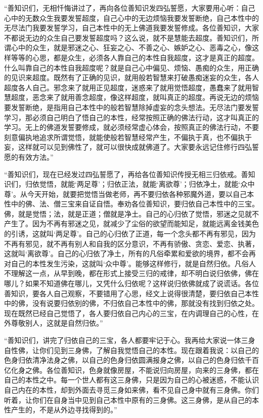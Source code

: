 \documentclass[12pt,twoside,openany]{book}
\newcommand{\kai}[1]{{\CJKfamily{kai}#1}}
\begin{document}
\kai{“善知识们，无相忏悔讲过了，再向各位善知识发四弘誓愿，大家要用心听：自己心中的无数众生我要发誓超度，自己心中的无边烦恼我要发誓断绝，自己本性中的无尽法门我要发誓学习，自己本性中的无上佛道我要发誓修成。各位善知识，大家不都说无边的众生自己要发誓超度吗？这么说，就不是慧能去超度。善知识们，所谓心中的众生，就是邪迷之心、狂妄之心、不善之心、嫉妒之心、恶毒之心，像这样等等的心思，都是众生，必须各人靠自己的本性自我超度，这才是真正的超度。什么叫靠自己的本性自我超度呢？就是自己心中偏见、烦恼、愚痴的众生，用正确的见识来超度。既然有了正确的见识，就用般若智慧来打破愚痴迷妄的众生，各人超度各人自己。邪念来了就用正见超度，迷惑来了就用觉悟超度，愚蠢来了就用智慧超度，恶念来了就用善念超度，像这样超度，就叫真正的超度。再说无边的烦恼要发誓断绝，是指用自己本性中的般若智慧除掉虚妄的念头想法。无尽法门要发誓学习，那必须自己明白了悟自己的本性，经常按照正确的佛法行动，这才叫真正的学习。无上的佛道发誓要修成，就必须经常虚心体会，按照真正的佛法行动，不要刻意偏执地追求所谓觉悟，就能使般若智慧经常产生，不偏执于真，也不偏执于妄，这样就可以见到佛性了，就可以很快成就佛道了。大家要永远记住修行四弘誓愿的有效方法。”
	
“善知识们，现在已经发过四弘誓愿了，再给各位善知识传授无相三归依戒。善知识们，归依觉悟，就能‘两足尊’；归依正法，就能‘离欲尊’；归依净土，就能‘众中尊’。从今天开始，就要把觉悟当做老师，再不要归依各种邪魔外道，要以自己本性中的佛、法、僧三宝来自证自悟。奉劝各位善知识，要归依自己本性中的三宝。佛，就是觉悟；法，就是正道；僧就是净土。自己的心归依了觉悟，邪迷之见就不产生了。因为不再有邪迷之见，就减少了尘俗的欲望而能知足，就能远离金钱美色的引诱，这就叫‘两足尊’。自己的心归依了正道，每一个念头都不再有邪见，因为不再有邪见，就不再有别人和自我的区分意识，不再有骄傲、贪恋、爱恋、执著，这就叫‘离欲尊’。自己的心归依了净土，所有的凡俗牵累和爱欲的境界，都不会再对自己的本性发生污染，这就叫‘众中尊’。能够这样修行，就是自然归依。凡俗人不理解这一点，从早到晚，都在形式上接受三归的戒律，却不明白说归依佛，佛在哪儿？如果不知道佛在哪儿，又凭什么归依呢？这样说归依佛就成了说谎话。各位善知识，要各人自己观察，不要错用了心思，经文上说得很清楚，要归依自己本性中的佛，没有说要归依别的佛，不归依自己本性中的佛，那就没有找到归依之处。现在既然已经自己觉悟了，各人要归依自己内心的三宝，在内调理自己的心性，在外尊敬别人，这就是自然归依。”

“善知识们，讲完了归依自己的三宝，各人都要牢记于心。我再给大家说一体三身自性佛，让你们见到三身佛，了解自我觉悟自己的本性。现在跟着我说：以自己的色身归依清净法身之佛，以自己的色身归依圆满报身之佛，以自己的色身归依千百亿化身之佛。各位善知识，色身就像房屋，不能说归向房屋，向来的三身佛，都在自己的本性之中。每一个世人都有这三身佛，只是因为自己的心被迷惑，不能认识自己内在的本性，却到外面去寻觅三身如来佛，看不见自己身中就有三身佛。你们听着，让你们在自身当中见到自己本性中原有的三身佛。这三身佛，是从自己的本性产生的，不是从外边寻找得到的。”

}
\end{document}
